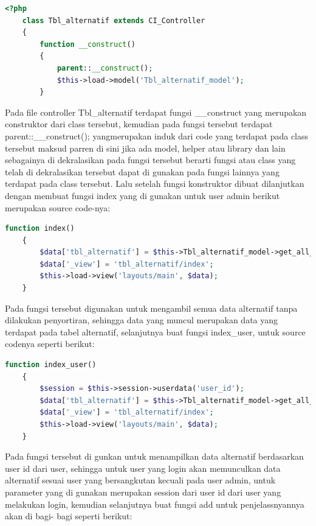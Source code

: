 \begin{lstlisting}[language=PHP]
	<?php  
	class Tbl_alternatif extends CI_Controller  
	{  
	    function __construct()  
	    {  
	        parent::__construct();  
	        $this->load->model('Tbl_alternatif_model');  
	    }  
\end{lstlisting}

Pada file controller Tbl\_alternatif terdapat fungsi \_\_construct yang merupakan construktor dari class tersebut, kemudian pada fungsi tersebut terdapat parent::\_\_construct(); yangmerupakan induk dari code yang terdapat pada class tersebut maksud parren di sini jika ada model, helper atau library dan lain sebagainya di dekralasikan pada fungsi tersebut berarti fungsi atau class yang telah di dekralasikan tersebut dapat di gunakan pada fungsi lainnya yang terdapat pada class tersebut.
	Lalu setelah fungsi konstruktor dibuat dilanjutkan dengan membuat fungsi index yang di gunakan untuk user admin berikut merupakan source code-nya:\par
\begin{lstlisting}[language=PHP]
	function index()  
	{  
	    $data['tbl_alternatif'] = $this->Tbl_alternatif_model->get_all_tbl_alternatif_admin();  
	    $data['_view'] = 'tbl_alternatif/index';  
	    $this->load->view('layouts/main', $data);  
	}  
\end{lstlisting}

Pada fungsi tersebut digunakan untuk mengambil semua data alternatif tanpa dilakukan penyortiran, sehingga data yang muncul merupakan data yang terdapat pada tabel alternatif, selanjutnya buat fungsi index\_user, untuk source codenya seperti berikut:

\begin{lstlisting}[language=PHP]
	function index_user()  
	{ 
	    $session = $this->session->userdata('user_id'); 
	    $data['tbl_alternatif'] = $this->Tbl_alternatif_model->get_all_tbl_alternatif($session);  
	    $data['_view'] = 'tbl_alternatif/index';  
	    $this->load->view('layouts/main', $data);  
	}  
\end{lstlisting}


Pada fungsi tersebut di gunkan untuk menampilkan data alternatif berdasarkan user id dari user, sehingga untuk user yang login akan memunculkan data alternatif sesuai user yang bersangkutan kecuali pada user admin, untuk parameter yang di gunakan merupakan session dari user id dari user yang melakukan login, kemudian selanjutnya buat fungsi add untuk penjelassnyannya akan di bagi- bagi seperti berikut:\par

